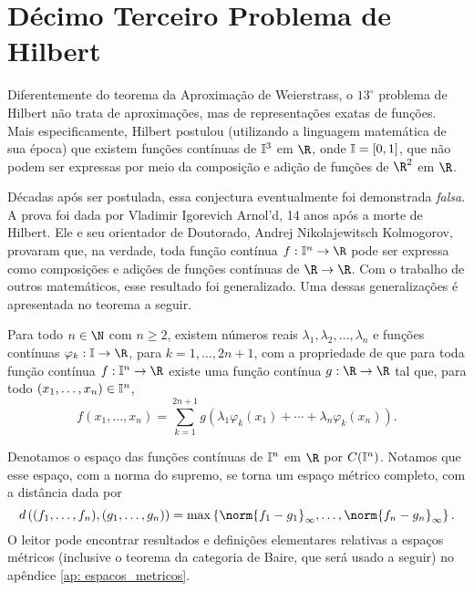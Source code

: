 \section{Décimo Terceiro Problema de Hilbert}

Diferentemente do teorema da Aproximação de Weierstrass, o \( 13^{ \circ } \) problema de Hilbert não trata de aproximações, mas de representações exatas de funções.
Mais especificamente, Hilbert postulou (utilizando a linguagem matemática de sua época) que existem funções contínuas de \( \mathbb{I}^{ 3 } \) em \( \R \), onde \( \mathbb{I} = [0, 1] \), que não podem ser expressas por meio da composição e adição de funções de \( \R^{ 2 } \) em \( \R \).

Décadas após ser postulada, essa conjectura eventualmente foi demonstrada \emph{falsa}.
A prova foi dada por Vladimir Igorevich Arnol'd, 14 anos após a morte de Hilbert.
Ele e seu orientador de Doutorado, Andrej Nikolajewitsch Kolmogorov, provaram que, na verdade, toda função contínua \( f : \I^{ n } \to \R \) pode ser expressa como composições e adições de funções contínuas de \( \R \to \R \).
Com o trabalho de outros matemáticos, esse resultado foi generalizado.
Uma dessas generalizações é apresentada no teorema a seguir.
\begin{teo}
    Para todo \( n \in \N \) com \( n \geq 2 \), existem números reais \( \lambda_{ 1 }, \lambda_{ 2 }, \dots, \lambda_{ n } \) e funções contínuas \( \varphi_{ k } : \I \to \R \), para \( k = 1, \dots, 2n + 1 \), com a propriedade de que para toda função contínua \( f : \I^{ n } \to \R \) existe uma função contínua \( g : \R \to \R \) tal que, para todo \( ( x_{ 1 }, \dots, x_{ n } ) \in \mathbb{I}^{ n } \),
    \begin{equation}
        f(x_{ 1 }, \dots, x_{ n }) =
        \sum_{ k=1 }^{ 2n+1 } g ( \lambda_{ 1 } \varphi_{ k } ( x_{ 1 } )  + \cdots + \lambda_{ n } \varphi_{ k } ( x_{ n } ) )
        \label{eq: kolmogorov_2}
    .\end{equation}
\end{teo}
\begin{rem}
    Denotamos o espaço das funções contínuas de \( \mathbb{I}^{ n } \) em \( \R \) por \( C(\mathbb{I}^{ n }) \).
    Notamos que esse espaço, com a norma do supremo, se torna um espaço métrico completo, com a distância dada por
    \begin{equation}
        d \left( 
            ( f_{ 1 }, \dots, f_{ n } ),
            ( g_{ 1 }, \dots, g_{ n } )
        \right)
        = \max \left\{ 
            \norm{ f_{ 1 } - g_{ 1 } }_{ \infty },
            \dots,
            \norm{ f_{ n } - g_{ n } }_{ \infty }
        \right\}
    .\end{equation}
    O leitor pode encontrar resultados e definições elementares relativas a espaços métricos (inclusive o teorema da categoria de Baire, que será usado a seguir) no apêndice \ref{ap: espacos_metricos}.
\end{rem}
